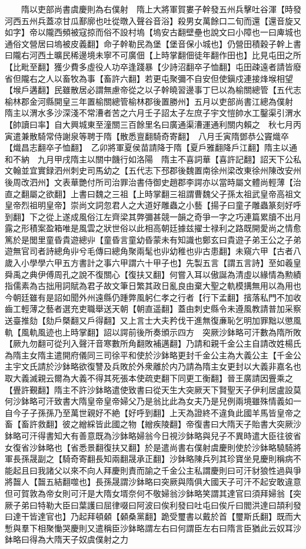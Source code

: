 　　隋以吏部尚書虞慶則為右僕射　隋上大將軍賀婁子幹發五州兵擊吐谷渾【時發河西五州兵蓋凉甘瓜鄯廓也吐從暾入聲谷音浴】殺男女萬餘口二旬而還【還音旋又如字】帝以隴西頻被寇掠而俗不設村塢【塢安古翻壁壘也說文曰小障也一曰庳城也通俗文營居曰塢被皮義翻】命子幹勒民為堡【堡音保小城也】仍營田積穀子幹上書曰隴右河西土曠民稀邊境未寧不可廣佃【上時掌翻佃徒年翻作田也】比見屯田之所【比毗至翻】獲少費多虛役人功卒逢踐暴【少詩沼翻卒子恤翻】屯田疎遠者請皆廢省但隴右之人以畜牧為事【畜許六翻】若更屯聚彌不自安但使鎭戍連接烽堠相望【堠戶遘翻】民雖散居必謂無慮帝從之以子幹曉習邊事丁巳以為榆關總管【五代志榆林郡金河縣開皇三年置榆關總管榆林郡後置勝州】五月以吏部尚書江總為僕射　隋主以渭水多沙深淺不常漕者苦之六月壬子詔太子左庶子宇文愷帥水工鑿渠引渭水【帥讀曰率】自大興城東至潼關三百餘里名曰廣通渠漕運通利關内賴之　秋七月丙寅遣兼散騎常侍謝泉等聘于隋【散悉亶翻騎奇寄翻】　八月壬寅隋鄧恭公竇熾卒【熾昌志翻卒子恤翻】　乙卯將軍夏侯苗請降于隋【夏戶雅翻降戶江翻】隋主以通和不納　九月甲戌隋主以關中饑行如洛陽　隋主不喜詞華【喜許記翻】詔天下公私文翰並宜實録泗州刺史司馬幼之【五代志下邳郡後魏置南徐州梁改東徐州陳改安州後周改泗州】文表華艷付所司治罪治書侍御史趙郡李諤亦以當時屬文體尚輕薄【治直之翻屬之欲翻】上書曰魏之三祖【上時掌翻三祖謂曹魏父子孫太祖武皇帝高祖文皇帝烈祖明皇帝】崇尚文詞忽君人之大道好雕蟲之小藝【揚子曰童子雕蟲篆刻好呼到翻】下之從上遂成風俗江左齊梁其弊彌甚競一韻之奇爭一字之巧連篇累牘不出月露之形積案盈箱唯是風雲之狀世俗以此相高朝廷據兹擢士禄利之路既開愛尚之情愈篤於是閭里童昏貴遊總丱【童昏言童幼昏蒙未有知識也鄭玄曰貴遊子弟王公之子弟遊無官司者詩總角丱兮毛傳曰總角聚兩髦也丱幼稚也丱古患翻】未窺六甲【古者八歲入小學學六甲五方書計之事六甲謂六十甲子也】先製五言【謂五言詩】至如羲皇舜禹之典伊傅周孔之說不復關心【復扶又翻】何嘗入耳以傲誕為清虛以緣情為勲績指儒素為古拙用詞賦為君子故文筆日繁其政日亂良由棄大聖之軌模搆無用以為用也今朝廷雖有是詔如聞外州遠縣仍踵弊風躬仁孝之行者【行下孟翻】擯落私門不加收齒工輕薄之藝者選充吏職舉送天朝【朝直遥翻】蓋由刺史縣令未遵風教請普加采察送臺推劾【劾戶槩翻又戶得翻】又上言士大夫矜伐干進無復亷恥乞明加罪黜以懲風軌【風軌風迹也上時掌翻】詔以諤前後所奏頒示四方　突厥沙鉢略可汗數為隋所敗【厥九勿翻可從刋入聲汗音寒數所角翻敗補邁翻】乃請和親千金公主自請改姓楊氏為隋主女隋主遣開府儀同三司徐平和使於沙鉢略更封千金公主為大義公主【千金公主宇文氏請於沙鉢略欲復讐及兵敗於外衆離於内乃請為隋主女更封以大義非嘉名也取大義滅親云爾為大義不得其死張本使疏吏翻下同更工衡翻】晉王廣請因舋乘之【舋許覲翻】隋主不許沙鉢略遣使致書曰從天生大突厥天下賢聖天子伊利居盧設莫何沙鉢略可汗致書大隋皇帝皇帝婦父乃是翁比此為女夫乃是兒例兩境雖殊情義如一自今子子孫孫乃至萬世親好不絶【好呼到翻】上天為證終不違負此國羊馬皆皇帝之畜【畜許救翻】彼之繒綵皆此國之物【繒疾陵翻】帝復書曰大隋天子貽書大突厥沙鉢略可汗得書知大有善意既為沙鉢略婦翁今日視沙鉢略與兒子不異時遣大臣往彼省女復省沙鉢略也【省悉景翻復扶又翻】於是遣尚書右僕射虞慶則使於沙鉢略驍騎將軍長孫晟副之【騎奇寄翻長知兩翻晟承正翻】沙鉢略陳兵列其珍寶坐見慶則稱病不能起且曰我諸父以來不向人拜慶則責而諭之千金公主私謂慶則曰可汗豺狼性過與爭將齧人【齧五結翻噬也】長孫晟謂沙鉢略曰突厥與隋俱大國天子可汗不起安敢違意但可賀敦為帝女則可汗是大隋女壻奈何不敬婦翁沙鉢略笑謂其達官曰須拜婦翁【突厥子弟曰特勒大臣曰葉護曰屈律啜曰阿波曰俟利發曰吐屯曰俟斤曰閻洪達曰頡利發曰達干皆達官也】乃起拜頓顙【顙桑黨翻】跪受璽書以戴於首【璽斯氏翻】既而大慙與羣下相聚慟哭慶則又遣稱臣沙鉢略謂左右曰何謂臣左右曰隋言臣猶此云奴耳沙鉢略曰得為大隋天子奴虞僕射之力